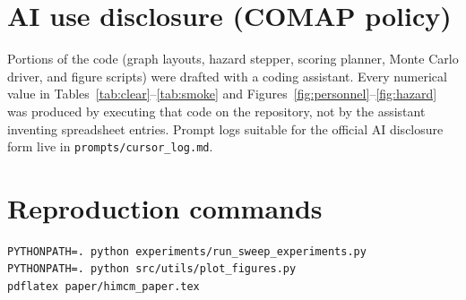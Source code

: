 \documentclass[12pt]{article}
\begin{document}
\appendix
\section{AI use disclosure (COMAP policy)}
Portions of the code (graph layouts, hazard stepper, scoring planner, Monte Carlo
driver, and figure scripts) were drafted with a coding assistant. Every numerical
value in Tables~\ref{tab:clear}--\ref{tab:smoke} and Figures~\ref{fig:personnel}--\ref{fig:hazard}
was produced by executing that code on the repository, not by the assistant inventing
spreadsheet entries. Prompt logs suitable for the official AI disclosure form live in
\texttt{prompts/cursor\_log.md}.

\section{Reproduction commands}
\begin{verbatim}
PYTHONPATH=. python experiments/run_sweep_experiments.py
PYTHONPATH=. python src/utils/plot_figures.py
pdflatex paper/himcm_paper.tex
\end{verbatim}
\end{document}
